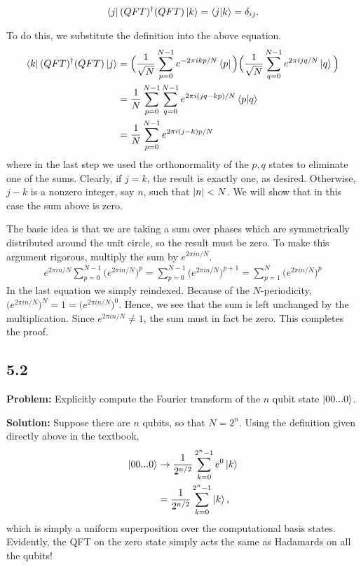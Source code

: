 \documentclass{article}
\begin{document}
\begin{align} \label{eq:5.1:QFT_unitary}
    \bra{j}(QFT)^\dagger(QFT)\ket{k} = \braket{j}{k} = \delta_{ij}.
\end{align}

To do this, we substitute the definition into the above equation. 
\begin{align} \label{eq:5.1:expand_and_simplify}
\begin{aligned}
    \bra{k}(QFT)^\dagger(QFT)\ket{j} &= \Big(\frac{1}{\sqrt{N}}\sum_{p=0}^{N-1}e^{-2\pi ikp/N}\bra{p}\Big)\Big(\frac{1}{\sqrt{N}}\sum_{q=0}^{N-1}e^{2\pi ijq/N}\ket{q}\Big) \\
    &= \frac{1}{N}\sum_{p=0}^{N-1}\sum_{q=0}^{N-1}e^{2\pi i(jq-kp)/N}\braket{p}{q} \\
    &= \frac{1}{N}\sum_{p=0}^{N-1} e^{2\pi i (j-k)p/N}
\end{aligned}
\end{align}
where in the last step we used the orthonormality of the $p,q$ states to eliminate one of the sums. Clearly, if $j=k$, the result is exactly one, as desired. Otherwise, $j-k$ is a nonzero integer, say $n$, such that $\abs{n}<N$. We will show that in this case the sum above is zero. 

The basic idea is that we are taking a sum over phases which are symmetrically distributed around the unit circle, so the result must be zero. To make this argument rigorous, multiply the sum by $e^{2\pi i n/N}$.
\begin{align}
    e^{2\pi i n/N}\sum_{p=0}^{N-1}\big(e^{2\pi i n/N}\big)^p = \sum_{p=0}^{N-1}\big(e^{2\pi i n/N}\big)^{p+1} = \sum_{p=1}^{N}\big(e^{2\pi i n/N}\big)^{p}
\end{align}
In the last equation we simply reindexed. Because of the $N$-periodicity, $\big(e^{2\pi i n/N}\big)^N = 1 = \big(e^{2\pi i n/N}\big)^0$. Hence, we see that the sum is left unchanged by the multiplication. Since $e^{2\pi i n/N} \neq 1$, the sum must in fact be zero. This completes the proof.

\subsection*{5.2}
\textbf{Problem:} Explicitly compute the Fourier transform of the $n$ qubit state $\ket{00...0}$.

\textbf{Solution:} Suppose there are $n$ qubits, so that $N=2^n$. Using the definition given directly above in the textbook,
\begin{align}
    \ket{00...0} &\rightarrow \frac{1}{2^{n/2}} \sum_{k=0}^{2^n-1}e^0 \ket{k} \\
    &= \frac{1}{2^{n/2}}\sum_{k=0}^{2^n-1}\ket{k},
\end{align}
which is simply a uniform superposition over the computational basis states. Evidently, the QFT on the zero state simply acts the same as Hadamards on all the qubits!
\end{document}

